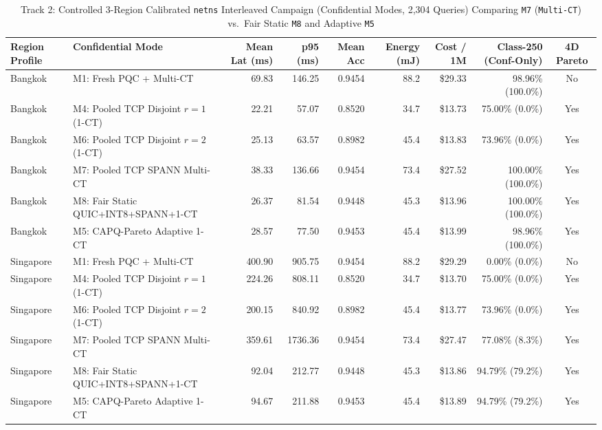 \documentclass[10pt,journal,compsoc]{IEEEtran}
\begin{document}
\begin{table}[!t]
\centering
\caption{Track 2: Controlled 3-Region Calibrated \texttt{netns} Interleaved Campaign (Confidential Modes, 2,304 Queries) Comparing \texttt{M7} (\texttt{Multi-CT}) vs.\ Fair Static \texttt{M8} and Adaptive \texttt{M5}}
\label{tab:wan_ctrl}
\footnotesize
\begin{adjustbox}{max width=\textwidth}
\begin{tabular}{llrrrrrrc}
\toprule
\textbf{Region Profile} & \textbf{Confidential Mode} & \textbf{Mean Lat (ms)} & \textbf{p95 (ms)} & \textbf{Mean Acc} & \textbf{Energy (mJ)} & \textbf{Cost / 1M} & \textbf{Class-250 (Conf-Only)} & \textbf{4D Pareto} \\
\midrule
Bangkok & M1: Fresh PQC + Multi-CT & 69.83 & 146.25 & 0.9454 & 88.2 & \$29.33 & 98.96\% (100.0\%) & No \\
Bangkok & M4: Pooled TCP Disjoint $r=1$ (1-CT) & 22.21 & 57.07 & 0.8520 & 34.7 & \$13.73 & 75.00\% (0.0\%) & Yes \\
Bangkok & M6: Pooled TCP Disjoint $r=2$ (1-CT) & 25.13 & 63.57 & 0.8982 & 45.4 & \$13.83 & 73.96\% (0.0\%) & Yes \\
Bangkok & M7: Pooled TCP SPANN Multi-CT & 38.33 & 136.66 & 0.9454 & 73.4 & \$27.52 & 100.00\% (100.0\%) & Yes \\
Bangkok & M8: Fair Static QUIC+INT8+SPANN+1-CT & 26.37 & 81.54 & 0.9448 & 45.3 & \$13.96 & 100.00\% (100.0\%) & Yes \\
Bangkok & M5: CAPQ-Pareto Adaptive 1-CT & 28.57 & 77.50 & 0.9453 & 45.4 & \$13.99 & 98.96\% (100.0\%) & Yes \\
\midrule
Singapore & M1: Fresh PQC + Multi-CT & 400.90 & 905.75 & 0.9454 & 88.2 & \$29.29 & 0.00\% (0.0\%) & No \\
Singapore & M4: Pooled TCP Disjoint $r=1$ (1-CT) & 224.26 & 808.11 & 0.8520 & 34.7 & \$13.70 & 75.00\% (0.0\%) & Yes \\
Singapore & M6: Pooled TCP Disjoint $r=2$ (1-CT) & 200.15 & 840.92 & 0.8982 & 45.4 & \$13.77 & 73.96\% (0.0\%) & Yes \\
Singapore & M7: Pooled TCP SPANN Multi-CT & 359.61 & 1736.36 & 0.9454 & 73.4 & \$27.47 & 77.08\% (8.3\%) & Yes \\
Singapore & M8: Fair Static QUIC+INT8+SPANN+1-CT & 92.04 & 212.77 & 0.9448 & 45.3 & \$13.86 & 94.79\% (79.2\%) & Yes \\
Singapore & M5: CAPQ-Pareto Adaptive 1-CT & 94.67 & 211.88 & 0.9453 & 45.4 & \$13.89 & 94.79\% (79.2\%) & Yes \\

\end{tabular}
\end{adjustbox}
\end{table}
\end{document}
